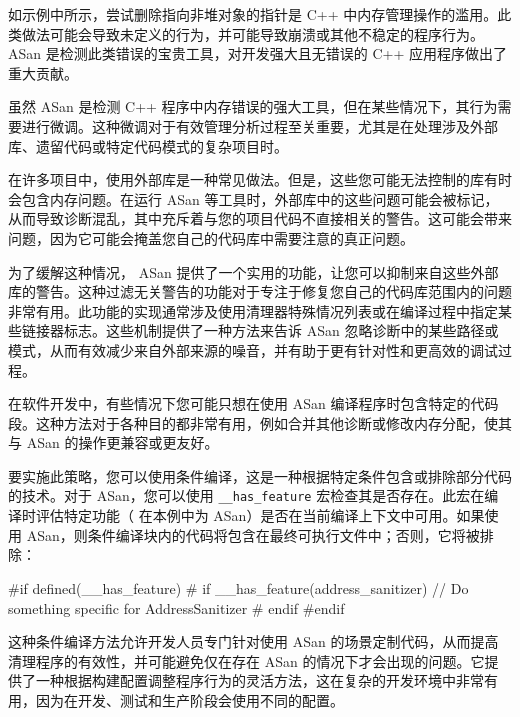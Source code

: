 如示例中所示，尝试删除指向非堆对象的指针是 C++ 中内存管理操作的滥用。此类做法可能会导致未定义的行为，并可能导致崩溃或其他不稳定的程序行为。 ASan 是检测此类错误的宝贵工具，对开发强大且无错误的 C++ 应用程序做出了重大贡献。


虽然 ASan 是检测 C++ 程序中内存错误的强大工具，但在某些情况下，其行为需要进行微调。这种微调对于有效管理分析过程至关重要，尤其是在处理涉及外部库、遗留代码或特定代码模式的复杂项目时。


在许多项目中，使用外部库是一种常见做法。但是，这些您可能无法控制的库有时会包含内存问题。在运行 ASan 等工具时，外部库中的这些问题可能会被标记，从而导致诊断混乱，其中充斥着与您的项目代码不直接相关的警告。这可能会带来问题，因为它可能会掩盖您自己的代码库中需要注意的真正问题。

为了缓解这种情况， ASan 提供了一个实用的功能，让您可以抑制来自这些外部库的警告。这种过滤无关警告的功能对于专注于修复您自己的代码库范围内的问题非常有用。此功能的实现通常涉及使用清理器特殊情况列表或在编译过程中指定某些链接器标志。这些机制提供了一种方法来告诉 ASan 忽略诊断中的某些路径或模式，从而有效减少来自外部来源的噪音，并有助于更有针对性和更高效的调试过程。


在软件开发中，有些情况下您可能只想在使用 ASan 编译程序时包含特定的代码段。这种方法对于各种目的都非常有用，例如合并其他诊断或修改内存分配，使其与 ASan 的操作更兼容或更友好。

要实施此策略，您可以使用条件编译，这是一种根据特定条件包含或排除部分代码的技术。对于 ASan，您可以使用 \verb|__has_feature| 宏检查其是否存在。此宏在编译时评估特定功能（ 在本例中为 ASan）是否在当前编译上下文中可用。如果使用 ASan，则条件编译块内的代码将包含在最终可执行文件中；否则，它将被排除：

\begin{cpp}
#if defined(__has_feature)
# if __has_feature(address_sanitizer)
// Do something specific for AddressSanitizer
# endif
#endif
\end{cpp}

这种条件编译方法允许开发人员专门针对使用 ASan 的场景定制代码，从而提高清理程序的有效性，并可能避免仅在存在 ASan 的情况下才会出现的问题。它提供了一种根据构建配置调整程序行为的灵活方法，这在复杂的开发环境中非常有用，因为在开发、测试和生产阶段会使用不同的配置。



